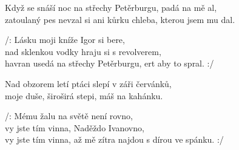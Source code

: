 
\ve{}
Když se snáší noc na střechy Petěrburgu, padá na mě al,\\
zatoulaný pes nevzal si ani kůrku chleba, kterou jsem mu dal.

\cho{}
/: Lásku moji kníže Igor si bere,\\
nad sklenkou vodky hraju si s revolverem,\\
havran usedá na střechy Petěrburgu, ert aby to spral. :/

\ve{}
Nad obzorem letí ptáci slepí v záři červánků,\\
moje duše, široširá stepi, máš na kahánku.

\cho{}
/: Mému žalu na světě není rovno,\\
vy jste tím vinna, Naděždo Ivanovno,\\
vy jste tím vinna, až mě zítra najdou s dírou ve spánku. :/

\esong{}
